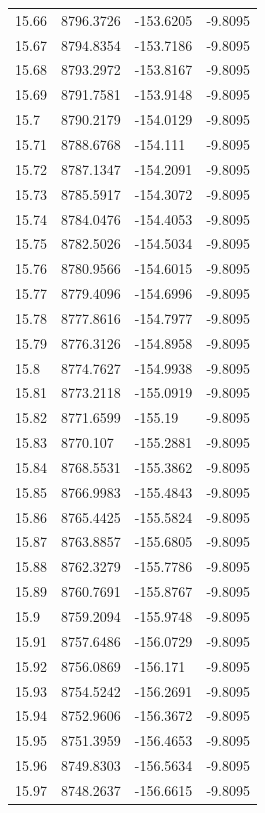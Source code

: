 \begin{table}[H]
\begin{tabular}{llll}
15.66 & 8796.3726 & -153.6205 & -9.8095 \\
15.67 & 8794.8354 & -153.7186 & -9.8095 \\
15.68 & 8793.2972 & -153.8167 & -9.8095 \\
15.69 & 8791.7581 & -153.9148 & -9.8095 \\
15.7 & 8790.2179 & -154.0129 & -9.8095 \\
15.71 & 8788.6768 & -154.111 & -9.8095 \\
15.72 & 8787.1347 & -154.2091 & -9.8095 \\
15.73 & 8785.5917 & -154.3072 & -9.8095 \\
15.74 & 8784.0476 & -154.4053 & -9.8095 \\
15.75 & 8782.5026 & -154.5034 & -9.8095 \\
15.76 & 8780.9566 & -154.6015 & -9.8095 \\
15.77 & 8779.4096 & -154.6996 & -9.8095 \\
15.78 & 8777.8616 & -154.7977 & -9.8095 \\
15.79 & 8776.3126 & -154.8958 & -9.8095 \\
15.8 & 8774.7627 & -154.9938 & -9.8095 \\
15.81 & 8773.2118 & -155.0919 & -9.8095 \\
15.82 & 8771.6599 & -155.19 & -9.8095 \\
15.83 & 8770.107 & -155.2881 & -9.8095 \\
15.84 & 8768.5531 & -155.3862 & -9.8095 \\
15.85 & 8766.9983 & -155.4843 & -9.8095 \\
15.86 & 8765.4425 & -155.5824 & -9.8095 \\
15.87 & 8763.8857 & -155.6805 & -9.8095 \\
15.88 & 8762.3279 & -155.7786 & -9.8095 \\
15.89 & 8760.7691 & -155.8767 & -9.8095 \\
15.9 & 8759.2094 & -155.9748 & -9.8095 \\
15.91 & 8757.6486 & -156.0729 & -9.8095 \\
15.92 & 8756.0869 & -156.171 & -9.8095 \\
15.93 & 8754.5242 & -156.2691 & -9.8095 \\
15.94 & 8752.9606 & -156.3672 & -9.8095 \\
15.95 & 8751.3959 & -156.4653 & -9.8095 \\
15.96 & 8749.8303 & -156.5634 & -9.8095 \\
15.97 & 8748.2637 & -156.6615 & -9.8095 \\

\end{tabular}
\end{table}
